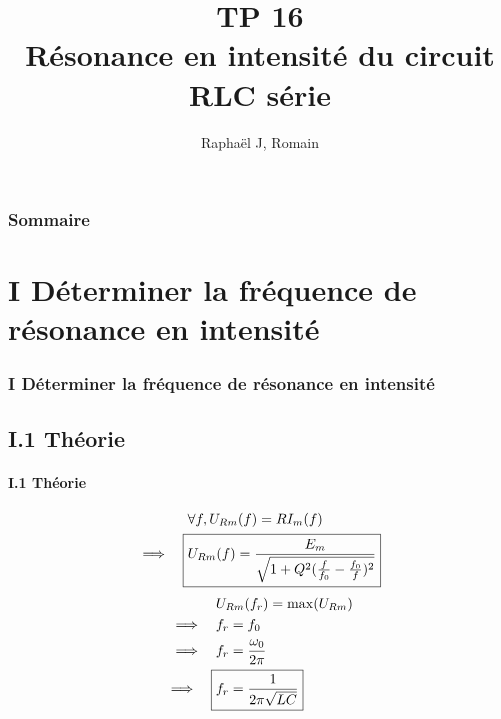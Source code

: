 \documentclass{beamer}
\title{TP 16 \\ Résonance en intensité du circuit RLC série}
\author{Raphaël J, Romain}
\date{}
\begin{document}
\frame{\titlepage}

\begin{frame}
    \frametitle{Sommaire}
    \tableofcontents
\end{frame}

\section{I Déterminer la fréquence de résonance en intensité}

\begin{frame}
    \frametitle{I Déterminer la fréquence de résonance en intensité}
    \subsection{I.1 Théorie}
    \framesubtitle{I.1 Théorie}

        \begin{align*}
            &\forall f, U_{Rm}(f) = RI_m(f) \\
            \implies \quad \Aboxed{&U_{Rm}(f)= \frac{E_m}{\sqrt{1+Q^2(\frac{f}{f_0}-\frac{f_0}{f})^2}}}
        \end{align*} \vspace{15pt}
        \begin{align*}
            &U_{Rm}(f_r) = \max(U_{Rm}) \\
            \implies \quad &f_r=f_0 \\
            \implies \quad &f_r = \frac{\omega_0}{2\pi} \\
            \implies \quad \Aboxed{&f_r = \frac{1}{2\pi \sqrt{LC}}}
        \end{align*}
    \end{frame}
\end{document}
